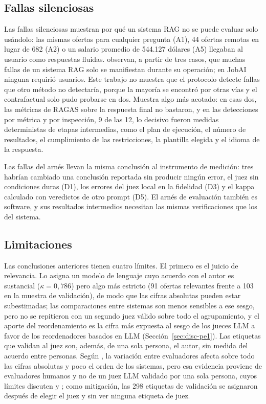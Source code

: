 \subsection{Fallas silenciosas}

Las fallas silenciosas muestran por qué un sistema RAG no se puede evaluar solo usándolo: las mismas ofertas para cualquier pregunta (A1), 44 ofertas remotas en lugar de 682 (A2) o un salario promedio de 544.127 dólares (A5) llegaban al usuario como respuestas fluidas. \citet{Barnett2024} observan, a partir de tres casos, que muchas fallas de un sistema RAG solo se manifiestan durante su operación; en JobAI ninguna requirió usuarios. Este trabajo no muestra que el protocolo detecte fallas que otro método no detectaría, porque la mayoría se encontró por otras vías y el contrafactual solo pudo probarse en dos. Muestra algo más acotado: en esas dos, las métricas de RAGAS sobre la respuesta final no bastaron, y en las detecciones por métrica y por inspección, 9 de las 12, lo decisivo fueron medidas deterministas de etapas intermedias, como el plan de ejecución, el número de resultados, el cumplimiento de las restricciones, la plantilla elegida y el idioma de la respuesta.

Las fallas del arnés llevan la misma conclusión al instrumento de medición: tres habrían cambiado una conclusión reportada sin producir ningún error, el juez sin condiciones duras (D1), los errores del juez local en la fidelidad (D3) y el kappa calculado con veredictos de otro prompt (D5). El arnés de evaluación también es software, y sus resultados intermedios necesitan las mismas verificaciones que los del sistema.

\subsection{Limitaciones}
\label{sec:res-limitaciones}

Las conclusiones anteriores tienen cuatro límites. El primero es el juicio de relevancia. Lo asigna un modelo de lenguaje cuyo acuerdo con el autor es sustancial ($\kappa = 0{,}786$) pero algo más estricto (91 ofertas relevantes frente a 103 en la muestra de validación), de modo que las cifras absolutas pueden estar subestimadas; las comparaciones entre sistemas son menos sensibles a ese sesgo, pero no se repitieron con un segundo juez válido sobre todo el agrupamiento, y el aporte del reordenamiento es la cifra más expuesta al sesgo de los jueces LLM a favor de los reordenadores basados en LLM (Sección~\ref{sec:disc-pe1}). Las etiquetas que validan al juez son, además, de una sola persona, el autor, sin medida del acuerdo entre personas. Según \citet{Voorhees2000}, la variación entre evaluadores afecta sobre todo las cifras absolutas y poco el orden de los sistemas, pero esa evidencia proviene de evaluadores humanos y no de un juez LLM validado por una sola persona, cuyos límites discuten \citet{Soboroff2025} y \citet{ClarkeDietz2024}; como mitigación, las 298 etiquetas de validación se asignaron después de elegir el juez y sin ver ninguna etiqueta de juez.

